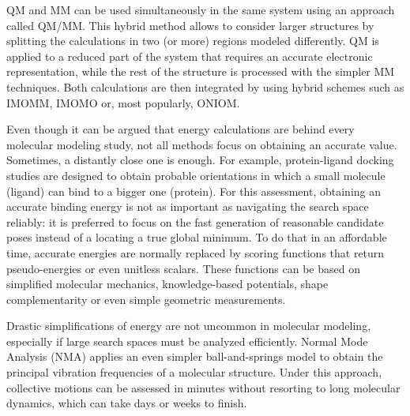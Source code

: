 QM and MM can be used simultaneously in the same system using an approach called QM/MM. This hybrid method allows to consider larger structures by splitting the calculations in two (or more) regions modeled differently. QM is applied to a reduced part of the system that requires an accurate electronic representation, while the rest of the structure is processed with the simpler MM techniques. Both calculations are then integrated by using hybrid schemes such as IMOMM,\cite{maseras1995imomm} IMOMO\cite{humbel1996imomo} or, most popularly, ONIOM.\cite{svensson1996oniom}

Even though it can be argued that energy calculations are behind every molecular modeling study, not all methods focus on obtaining an accurate value. Sometimes, a distantly close one is enough. For example, protein-ligand docking studies are designed to obtain probable orientations in which a small molecule (ligand) can bind to a bigger one (protein). For this assessment, obtaining an accurate binding energy is not as important as navigating the search space reliably: it is preferred to focus on the fast generation of reasonable candidate poses instead of a locating a true global minimum. To do that in an affordable time, accurate energies are normally replaced by scoring functions that return pseudo-energies or even unitless scalars. These functions can be based on simplified molecular mechanics, knowledge-based potentials, shape complementarity or even simple geometric measurements.

Drastic simplifications of energy are not uncommon in molecular modeling, especially if large search spaces must be analyzed efficiently. Normal Mode Analysis (NMA) applies an even simpler ball-and-springs model to obtain the principal vibration frequencies of a molecular structure. Under this approach, collective motions can be assessed in minutes without resorting to long molecular dynamics, which can take days or weeks to finish.



